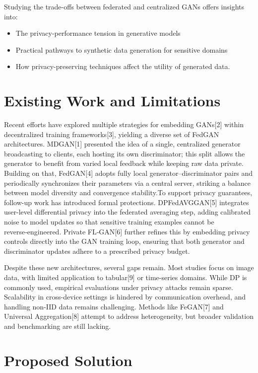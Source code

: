 \documentclass{article}
\begin{document}
Studying the trade-offs between federated and centralized GANs offers insights into:
\begin{itemize}[itemsep=0.5ex, topsep=0.5ex, parsep=0pt, partopsep=0pt]
  \item The privacy-performance tension in generative models
  \item Practical pathways to synthetic data generation for sensitive domains
  \item How privacy-preserving techniques affect the utility of generated data.
\end{itemize}

\section{Existing Work and Limitations}

Recent efforts have explored multiple strategies for embedding GANs[2] within decentralized training frameworks[3], yielding a diverse set of FedGAN architectures. MDGAN[1] presented the idea of a single, centralized generator broadcasting to clients, each hosting its own discriminator; this split allows the generator to benefit from varied local feedback while keeping raw data private. Building on that, FedGAN[4] adopts fully local generator–discriminator pairs and periodically synchronizes their parameters via a central server, striking a balance between model diversity and convergence stability.To support privacy guarantees, follow-up work has introduced formal protections. DPFedAVGGAN[5] integrates user-level differential privacy into the federated averaging step, adding calibrated noise to model updates so that sensitive training examples cannot be reverse‑engineered. Private FL‑GAN[6] further refines this by embedding privacy controls directly into the GAN training loop, ensuring that both generator and discriminator updates adhere to a prescribed privacy budget.

Despite these new architectures, several gaps remain. Most studies focus on image data, with limited application to tabular[9] or time-series domains. While DP is commonly used, empirical evaluations under privacy attacks remain sparse. Scalability in cross-device settings is hindered by communication overhead, and handling non-IID data remains challenging. Methods like FeGAN[7] and Universal Aggregation[8] attempt to address heterogeneity, but broader validation and benchmarking are still lacking.

\section{Proposed Solution}
\end{document}
